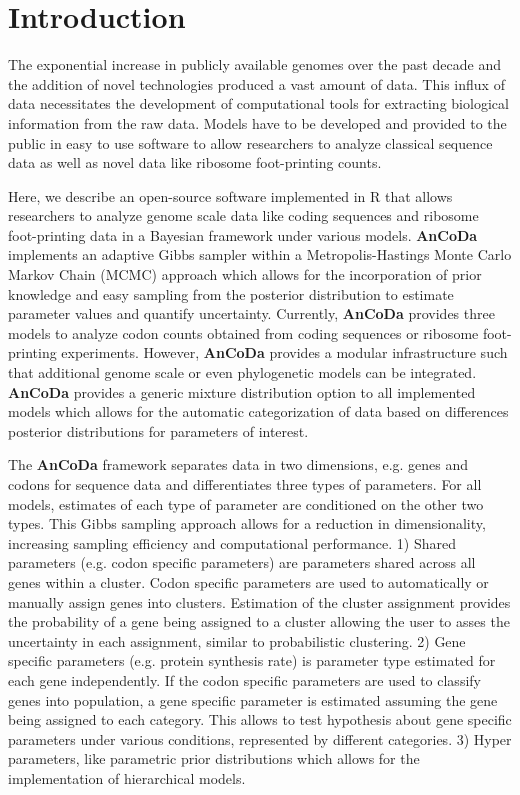 \documentclass{bioinfo}
\newcommand{\package}{\textbf{AnCoDa }} %
\begin{document}
\section*{Introduction}
The exponential increase in publicly available genomes over the past decade and the addition of novel technologies produced a vast amount of data.  
This influx of data necessitates the development of computational tools for extracting biological information from the raw data. 
Models have to be developed and provided to the public in easy to use software to allow researchers to analyze classical sequence data as well as novel data like ribosome foot-printing counts.

Here, we describe an open-source software implemented in R \citep{rcore} that allows researchers to analyze genome scale data like coding sequences and ribosome foot-printing data in a Bayesian framework under various models. 
\package implements an adaptive Gibbs sampler within a Metropolis-Hastings Monte Carlo Markov Chain (MCMC) approach which allows for the incorporation of prior knowledge and easy sampling from the posterior distribution to estimate parameter values and quantify uncertainty.
Currently, \package provides three models to analyze codon counts obtained from coding sequences or ribosome foot-printing experiments. However, \package provides a modular infrastructure such that additional genome scale or even phylogenetic models can be integrated. 
\package provides a generic mixture distribution option to all implemented models which allows for the automatic categorization of data based on differences posterior distributions for parameters of interest.

The \package framework separates data in two dimensions, e.g. genes and codons for sequence data and differentiates three types of parameters.
For all models, estimates of each type of parameter are conditioned on the other two types. 
This Gibbs sampling approach allows for a reduction in dimensionality, increasing sampling efficiency and computational performance.
1) Shared parameters (e.g. codon specific parameters) are parameters shared across all genes within a cluster. Codon specific parameters are used to automatically or manually assign genes into clusters.
Estimation of the cluster assignment provides the probability of a gene being assigned to a cluster allowing the user to asses the uncertainty in each assignment, similar to probabilistic clustering.
2) Gene specific parameters (e.g. protein synthesis rate) is parameter type estimated for each gene independently. If the codon specific parameters are used to classify genes into population, a gene specific parameter is estimated assuming the gene being assigned to each category. This allows to test hypothesis about gene specific parameters under various conditions, represented by different categories.
3) Hyper parameters, like parametric prior distributions which allows for the implementation of hierarchical models.
\end{document}
